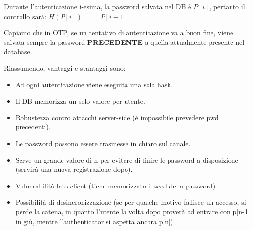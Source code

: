   \begin{remark}
    Durante l'autenticazione i-esima, la password salvata nel DB è $P[i]$, pertanto il controllo sarà: $H(P[i])==P[i-1]$
    \end{remark}
\begin{remark}
Capiamo che in OTP, se un tentativo di autenticazione va a buon fine, viene salvata sempre la password \textbf{PRECEDENTE} a quella attualmente presente nel database.
\end{remark}
Riassumendo, vantaggi e svantaggi sono: 
\begin{itemize}
    \item [\textcolor{green}{\checkmark}]Ad ogni autenticazione viene eseguita una sola hash.
    \item [\textcolor{green}{\checkmark}]Il DB memorizza un solo valore per utente.
    \item [\textcolor{green}{\checkmark}]Robustezza contro attacchi server-side (è impossibile prevedere pwd precedenti).
    \item [\textcolor{green}{\checkmark}]Le password possono essere trasmesse in chiaro sul canale.
    \item [\textcolor{red}{\ding{55}}]Serve un grande valore di n per evitare di finire le password a disposizione (servirà una nuova registrazione dopo).
    \item [\textcolor{red}{\ding{55}}]Vulnerabilità lato client (tiene memorizzato il seed della password).
    \item [\textcolor{red}{\ding{55}}]Possibilità di desincronizzazione (se per qualche motivo fallisce un accesso, si perde la catena, in quanto l'utente la volta dopo proverà ad entrare con p[n-1] in giù, mentre l'authenticator si aspetta ancora p[n]).
\end{itemize}
